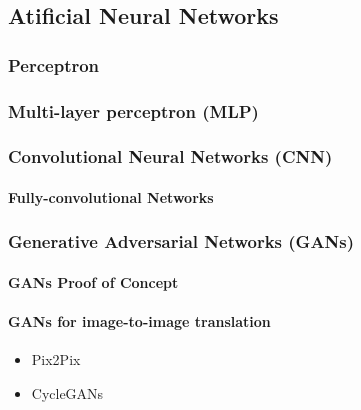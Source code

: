 \documentclass[../main.tex]{subfiles}
\begin{document}
\lipsum[1]

\subsection{Atificial Neural Networks}
\label{sec:atificial-neural-networks}

\lipsum[2]

\subsubsection{Perceptron}

\lipsum[3]

\subsubsection{Multi-layer perceptron (MLP)}

\lipsum[4]

\subsubsection{Convolutional Neural Networks (CNN)}

\lipsum[5-6]

\paragraph{Fully-convolutional Networks}

\subsubsection{Generative Adversarial Networks (GANs)}

\lipsum[7-8]

\paragraph{GANs Proof of Concept}

\lipsum[9]

\paragraph{GANs for image-to-image translation}

\begin{itemize}
  \item Pix2Pix
  \item CycleGANs
\end{itemize}

\printbibliography
\end{document}
